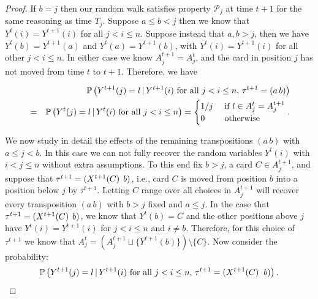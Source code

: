 \documentclass[11pt]{report}
\begin{document}
\begin{proof}
	
	If $b=j$ then our random walk satisfies property $\mathcal{P}_{j}$ at time $t+1$ for the same reasoning as time $T_{j}$. Suppose $a \leq b < j$ then  we know that $Y^{t}(i) = Y^{t+1}(i)$ for all $j<i \leq n$. Suppose instead that $a,b >j$, then we have $Y^{t}(b) = Y^{t+1}(a)$ and $Y^{t}(a) = Y^{t+1}(b)$, with $Y^{t}(i) = Y^{t+1}(i)$ for all other $j<i\leq n$. In either case we know $A_{j}^{t+1} = A_{j}^{t}$, and the card in position $j$ has not moved from time $t$ to $t+1$. Therefore, we have
	
	\begin{eqnarray}
	& & \mathbb{P}\left(Y^{t+1} (j) = l \, | \, Y^{t+1}(i) \textnormal{ for all } j < i \leq n, \, \tau^{t+1}  =(a \, b )\right) \\	
	& = & \mathbb{P}\left(Y^{t} (j) = l \, | \, Y^{t}(i) \textnormal{ for all } j < i \leq n \right)  = 
	\begin{cases}
	1/j & \textnormal{ if } l \in A_{j}^{t} = A_{j}^{t+1}\\
	0 & \textnormal{ otherwise } 
	\end{cases} \nonumber.
	\end{eqnarray}
	
	We now study in detail the effects of the remaining transpositions $(a \, b)$ with $a\leq j<b$.
	In this case  we can not fully recover the random variables $Y^{t}(i)$ with $i < j \leq n$ without extra assumptions. To this end fix $b>j$,  a card $C \in A_{j}^{t+1}$, and suppose that $\tau^{t+1} = (X^{t+1}(C) \hspace{0.15cm} b)$, i.e., card $C$ is moved from position $b$ into a position below $j$ by $\tau^{t+1}$. Letting $C$ range over all choices in $A_{j}^{t+1}$ will recover every transposition $(a \, b)$ with $b>j$ fixed and  $a\leq j$. In the case that  $\tau^{t+1} = (X^{t+1}(C) \hspace{0.15cm} b)$, we know that $Y^{t}(b) = C$ and the other positions above $j$ have $Y^{t}(i) = Y^{t+1}(i)$ for $j < i \leq n$ and $i \neq b$.  Therefore, for this choice of $\tau^{t+1}$ we know that $A_{j}^{t} = \left(A_{j}^{t+1} \sqcup \{Y^{t+1}(b)\} \right) \setminus \{C\}$. Now consider the probability:
	\begin{eqnarray}
	\mathbb{P}\left(Y^{t+1}(j) = l \, | \, Y^{t+1}(i) \textnormal{ for all } j < i \leq n , \, \tau^{t+1} = (X^{t+1}(C) \hspace{0.2cm} b)\right) \nonumber.
	\end{eqnarray}
	

\end{proof}
\end{document}
